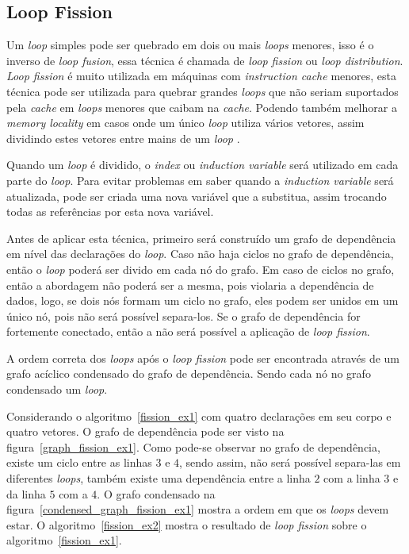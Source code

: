 
\subsection{Loop Fission}

Um \textit{loop} simples pode ser quebrado em dois ou mais \textit{loops}
menores, isso é o inverso de \textit{loop fusion}, essa técnica é chamada de
\textit{loop fission} ou \textit{loop distribution}.
\textit{Loop fission} é muito utilizada em máquinas com 
\textit{instruction cache} menores, esta técnica pode ser utilizada para quebrar
grandes \textit{loops} que não seriam suportados pela \textit{cache} em
\textit{loops} menores que caibam na \textit{cache}.
Podendo também melhorar a \textit{memory locality} em casos onde um único
\textit{loop} utiliza vários vetores, assim dividindo estes vetores entre mains 
de um \textit{loop} \cite{hpcfpc}.

Quando um \textit{loop} é dividido, o \textit{index} ou \textit{induction
variable} será utilizado em cada parte do \textit{loop}. 
Para evitar problemas em saber quando a \textit{induction variable} será
atualizada, pode ser criada uma nova variável que a substitua, assim trocando
todas as referências por esta nova variável.

Antes de aplicar esta técnica, primeiro será construído um grafo de dependência em
nível das declarações do \textit{loop}. 
Caso não haja ciclos no grafo de dependência, então o \textit{loop} poderá ser
divido em cada nó do grafo. 
Em caso de ciclos no grafo, então a abordagem não poderá ser a mesma, pois
violaria a dependência de dados, logo, se dois nós formam um ciclo no grafo,
eles podem ser unidos em um único nó, pois não será possível separa-los.
Se o grafo de dependência for fortemente conectado, então a não será possível a
aplicação de \textit{loop fission}.

A ordem correta dos \textit{loops} após o \textit{loop fission} pode ser
encontrada através de um grafo acíclico condensado do grafo de dependência.
Sendo cada nó no grafo condensado um \textit{loop}.

Considerando o algoritmo~\ref{fission_ex1} com quatro declarações em seu corpo e
quatro vetores. 
O grafo de dependência pode ser visto na figura~\ref{graph_fission_ex1}. 
Como pode-se observar no grafo de dependência, existe um ciclo entre as linhas
$3$ e $4$, sendo assim, não será possível separa-las em diferentes
\textit{loops}, também existe uma dependência entre a linha $2$ com a linha $3$
e da linha $5$ com a $4$.
O grafo condensado na figura~\ref{condensed_graph_fission_ex1} mostra a
ordem em que os \textit{loops} devem estar.
O algoritmo~\ref{fission_ex2} mostra o resultado de \textit{loop fission} sobre
o algoritmo~\ref{fission_ex1}.

